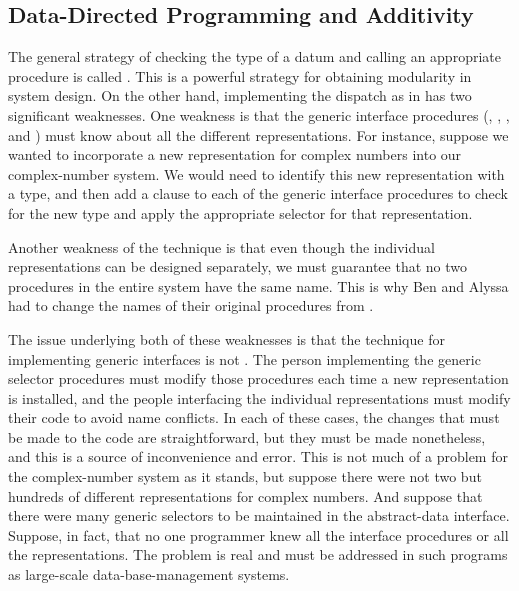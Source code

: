 \subsection{Data-Directed Programming and Additivity}
\label{Section 2.4.3}

The general strategy of checking the type of a datum and calling an appropriate
procedure is called .  This is a powerful strategy
for obtaining modularity in system design.  On the other hand, implementing the
dispatch as in  has two significant weaknesses.  One
weakness is that the generic interface procedures (,
, , and ) must know about all the
different representations.  For instance, suppose we wanted to incorporate a
new representation for complex numbers into our complex-number system.  We
would need to identify this new representation with a type, and then add a
clause to each of the generic interface procedures to check for the new type
and apply the appropriate selector for that representation.

Another weakness of the technique is that even though the individual
representations can be designed separately, we must guarantee that no two
procedures in the entire system have the same name.  This is why Ben and Alyssa
had to change the names of their original procedures from
.

The issue underlying both of these weaknesses is that the technique for
implementing generic interfaces is not .  The person
implementing the generic selector procedures must modify those procedures each
time a new representation is installed, and the people interfacing the
individual representations must modify their code to avoid name conflicts.  In
each of these cases, the changes that must be made to the code are
straightforward, but they must be made nonetheless, and this is a source of
inconvenience and error.  This is not much of a problem for the complex-number
system as it stands, but suppose there were not two but hundreds of different
representations for complex numbers.  And suppose that there were many generic
selectors to be maintained in the abstract-data interface.  Suppose, in fact,
that no one programmer knew all the interface procedures or all the
representations.  The problem is real and must be addressed in such programs as
large-scale data-base-management systems.

